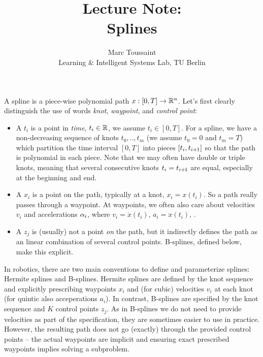 
\note

\title{Lecture Note:\\ Splines}
\author{Marc Toussaint\\\small Learning \& Intelligent Systems Lab, TU Berlin}

\makeatletter
\renewcommand{\@seccntformat}[1]{}
\makeatother

\newcommand{\des}{\text{des}}
\renewcommand{\Ref}{\text{ref}}
\renewcommand{\t}{\theta}
\renewcommand{\hat}{\widehat}
\newcommand{\bbg}{{\bar{\bar g}}}

\notetitle


A spline is a piece-wise polynomial path $x:[0,T] \to {\mathbb{R}}^n$. Let's
first clearly distinguish the use of words \emph{knot},
\emph{waypoint}, and \emph{control point}:
\begin{itemize}
\item A  $t_i$ is a point in \emph{time}, $t_i \in {\mathbb{R}}$,
  we assume $t_i \in [0,T]$. For a spline, we have a non-decreasing
  sequence of knots $t_0,..,t_m$ (we assume $t_0=0$ and $t_m=T$) which
  partition the time interval $[0,T]$ into pieces $[t_i, t_{i{{\hspace*{-.0pt}\text{\rm +}\hspace*{-.5pt}}1}}]$ so
  that the path is polynomial in each piece. Note that we may often
  have double or triple knots, meaning that several consecutive knots
  $t_i = t_{i{{\hspace*{-.0pt}\text{\rm +}\hspace*{-.5pt}}1}}$ are equal, especially at the beginning and end.
\item A  $x_i$ is a point on the path, typically at a
  knot, $x_i = x(t_i)$. So a path really passes through a waypoint. At
  waypoints, we often also care about velocities $v_i$ and
  accelerations $\alpha_i$, where $v_i = \dot x(t_i)$, $a_i = \ddot x(t_i)$, .
\item A  $z_j$ is (usually) not a point \emph{on}
  the path, but it indirectly defines the path as an linear
  combination of several control points. B-splines, defined below,
  make this explicit.
\end{itemize}

In robotics, there are two main conventions to define and parameterize splines: Hermite splines and B-splines. Hermite splines are defined by the knot sequence and explicitly prescribing waypoints $x_i$ and (for cubic) velocities $v_i$ at each knot (for quintic also acceperations $a_i$). In contrast, B-splines are specified by the knot sequence and $K$ control points $z_j$. As in B-splines we do not need to provide velocities as part of the specification, they are sometimes easier to use in practice. However, the resulting path does not go (exactly) through the provided control points -- the actual waypoints are implicit and ensuring exact prescribed waypoints implies solving a subproblem.

